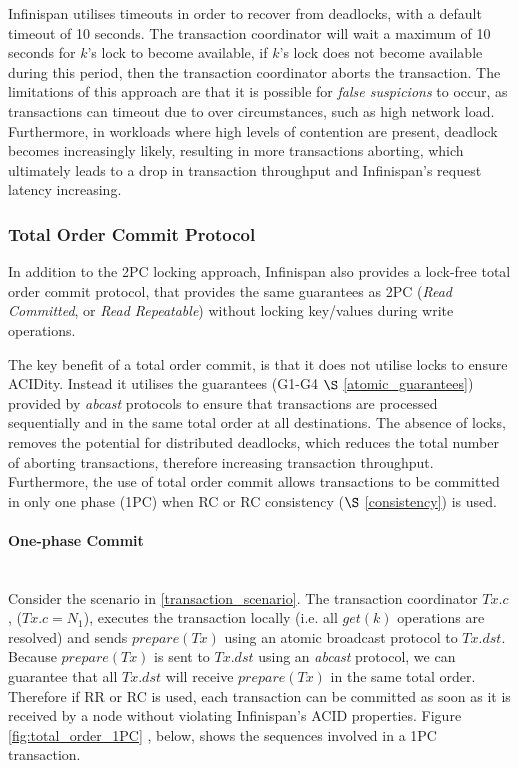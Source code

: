 	        Infinispan utilises timeouts in order to recover from deadlocks, with a default timeout of 10 seconds.  The transaction coordinator will wait a maximum of 10 seconds for $k$'s lock to become available, if $k$'s lock does not become available during this period, then the transaction coordinator aborts the transaction.  The limitations of this approach are that it is possible for \emph{false suspicions} to occur, as transactions can timeout due to over circumstances, such as high network load.  Furthermore, in workloads where high levels of contention are present, deadlock becomes increasingly likely, resulting in more transactions aborting, which ultimately leads to a drop in transaction throughput and Infinispan's request latency increasing.  

	    \subsubsection{Total Order Commit Protocol} \label{sec:to_commit}
	    In addition to the 2PC locking approach, Infinispan also provides a lock-free total order commit protocol, that provides the same guarantees as 2PC (\emph{Read Committed}, or \emph{ Read Repeatable}) without locking key/values during write operations.  
	    
	    The key benefit of a total order commit, is that it does not utilise locks to ensure ACIDity.  Instead it utilises the guarantees (G1-G4 $\S$ \ref{atomic_guarantees}) provided by \emph{abcast} protocols to ensure that transactions are processed sequentially and in the same total order at all destinations.  The absence of locks, removes the potential for distributed deadlocks, which reduces the total number of aborting transactions, therefore increasing transaction throughput\citep{Ruivo:2011:ETO:2120967.2121604}.  Furthermore, the use of total order commit allows transactions to be committed in only one phase (1PC) when RC or RC consistency ($\S$ \ref{consistency}) is used.  
	    
	        \paragraph{One-phase Commit} \hspace{0pt} \\
	        Consider the scenario in \ref{transaction_scenario}.  The transaction coordinator $Tx.c$, ($Tx.c = N_1$), executes the transaction locally (i.e. all $get(k)$ operations are resolved) and sends $prepare(Tx)$ using an atomic broadcast protocol to $Tx.dst$.  Because $prepare(Tx)$ is sent to $Tx.dst$ using an \emph{abcast} protocol, we can guarantee that all $Tx.dst$ will receive $prepare(Tx)$ in the same total order.  Therefore if RR or RC is used, each transaction can be committed as soon as it is received by a node without violating Infinispan's ACID properties.  Figure \ref{fig:total_order_1PC} , below, shows the sequences involved in a 1PC transaction.  
	        
